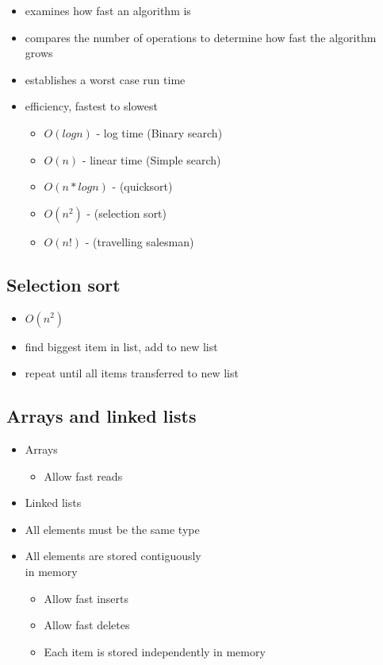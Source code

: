 \begin{itemize}
\item examines how fast an algorithm is 
\item compares the number of operations to determine how fast the algorithm grows 
\item establishes a worst case run time
\item efficiency, fastest to slowest
\begin{itemize} 
\item $O(log n)$ - log time (Binary search) 
\item $O(n)$ - linear time (Simple search) 
\item $O(n * log n)$ - (quicksort) 
\item $O(n^2)$ - (selection sort) 
\item $O(n!)$ - (travelling salesman) 
\end{itemize}
\end{itemize}
\subsection{Selection sort}
\begin{itemize}
\item $O(n^2)$
\item find biggest item in list, add to new list
\item repeat until all items transferred to new list
\end{itemize}
\subsection{Arrays and linked lists}

\begin{itemize}
\item Arrays
\begin{itemize}
\item Allow fast reads
\end{itemize}
\item Linked lists
\item All elements must be the same type
\item All elements are stored contiguously \\ in memory
\begin{itemize}
\item Allow fast inserts
\item Allow fast deletes
\item Each item is stored independently in memory
\end{itemize}
\end{itemize}


